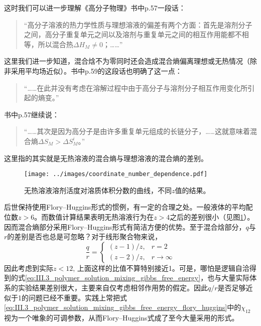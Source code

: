 \documentclass[main.tex]{subfiles}
\begin{document}
这时我们可以进一步理解《高分子物理》书中p.57一段话：
\begin{quotation}
    “高分子溶液的热力学性质与理想溶液的偏差有两个方面：首先是溶剂分子之间，高分子重复单元之间以及溶剂与重复单元之间的相互作用能都不相等，所以混合热$\Delta H_M\neq 0$；……”
\end{quotation}
这里我们进一步知道，混合焓不为零同时还会造成混合熵偏离理想或无热情况（除非采用平均场近似）。书中p.59的这段话也明确了这一点：
\begin{quotation}
    “……在此并没有考虑在溶解过程中由于高分子与溶剂分子相互作用变化所引起的熵变。”
\end{quotation}
书中p.57继续说：
\begin{quotation}
    “……其次是因为高分子是由许多重复单元组成的长链分子，……这就意味着混合熵$\Delta S_M>\Delta S_M^i$。”
\end{quotation}
这里指的其实就是无热溶液的混合熵与理想溶液的混合熵的差别。

\begin{figure}[ht]
    \centering
    \texttt{[image: ../images/coordinate\_number\_dependence.pdf]}
    \caption{无热溶液溶剂活度对溶质体积分数的曲线，不同$z$值的结果\cite{Tompa1956}。}
    \label{fig:coordinate_number_dependence}
\end{figure}

后世保持使用Flory--Huggins形式的惯例，有一定的合理之处。一般液体的平均配位数$z>6$。而数值计算结果表明无热溶液行为在$z>4$之后的差别很小（见图\ref{fig:coordinate_number_dependence}）。因而混合熵部分采用Flory--Huggins形式有简洁方便的优势。至于混合焓部分，$q$与$r$的差别是否也总是可忽略？对于线形聚合物来说，
\[
    \frac{q}{r}=\left\{\begin{array}{ll}\left(z-1\right)/z,& r=2\\\left(z-2\right)/z,&r\to\infty\end{array}\right.
\]
因此考虑到实际$z<12$, 上面这样的比值不算特别接近1。可是，哪怕是逻辑自洽得到的式\eqref{eq:III.3_polymer_solution_mixing_gibbs_free_energy}，也与大量实际体系的实验结果差别很大，主要来自仅考虑相邻作用势的假定。因此$q/r$是否足够近似于1的问题已经不重要。实践上常把式\eqref{eq:III.3_polymer_solution_mixing_gibbs_free_energy_flory_huggins}中的$\chi_{12}$视为一个唯象的可调参数，从而Flory--Huggins式成了至今大量采用的形式。
\end{document}
